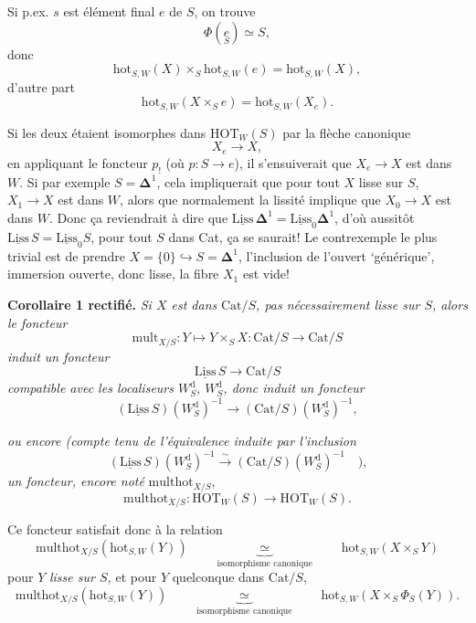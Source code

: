 \documentclass[11pt]{article}
\newcommand{\printedpage}[1]{\marginpar{\footnotesize p.~#1}}
\newcommand{\msp}[1]{\marginpar{\footnotesize [#1]}}
\newcommand{\hot}{\mathrm{hot}}
\newcommand{\HOT}{\mathrm{HOT}}
\newcommand{\Cat}{\mathrm{Cat}}
\newcommand{\Liss}{\underline{\mathrm{Liss}}}
\newcommand{\multhot}{\mathrm{multhot}}
\newcommand{\mult}{\mathrm{mult}}
\begin{document}
\printedpage{94}
Si p.ex. $s$ est élément final $e$ de $S$, on trouve
\[\Phi(\underset{S}{e}) \simeq S,\]
donc
\[\hot_{S,W}(X)\times_S \hot_{S,W}(e)=\hot_{S,W}(X),\]
d'autre part
\[\hot_{S,W}(X\times_S e)=\hot_{S,W}(X_e).\]

\msp{154}
Si les deux étaient isomorphes dans $\HOT_W(S)$ par la flèche canonique
\[X_e\longrightarrow X,\]
en appliquant le foncteur $p_!$ (où $p : S\longrightarrow e$), il s'ensuiverait que $X_e\longrightarrow X$ est dans $W$. Si par exemple $S=\mathbf{\Delta}^1$, cela impliquerait que pour tout $X$ lisse sur $S$, $X_1\longrightarrow X$ est dans $W$, alors que normalement la lissité implique que $X_0\longrightarrow X$ est dans $W$. Donc ça reviendrait à dire que $\Liss\,\mathbf{\Delta}^1=\Liss_0\mathbf{\Delta}^1$, d'où aussitôt $\Liss\,S=\Liss_0S$, pour tout $S$ dans Cat, ça se saurait! Le contrexemple le plus trivial est de prendre $X=\{0\}\hookrightarrow S=\mathbf{\Delta}^1$, l'inclusion de l'ouvert ‘générique’, immersion ouverte, donc lisse, la fibre $X_1$ est vide! %

\textbf{Corollaire 1 rectifié.} \textit{Si $X$ est dans} $\Cat/S$\textit{, pas nécessairement lisse sur $S$, alors le foncteur}
\[\mult_{X/S} : Y\longmapsto Y\times_S X : \Cat/S\longrightarrow \Cat/S\]
\textit{induit un foncteur}
\[\Liss\,S\longrightarrow \Cat/S\]
\textit{compatible avec les localiseurs $W_S^{\mathrm{d}}$, $W_S^{\mathrm{d}}$, donc induit un foncteur}
\[(\Liss\,S)(W_S^{\mathrm{d}})^{-1}\longrightarrow(\Cat/S)(W_S^{\mathrm{d}})^{-1},\]

\msp{155}
\textit{ou encore (compte tenu de l'équivalence induite par l'inclusion}
\[(\underline{\mathrm{Liss}}\,S)(W_S^{\mathrm{d}})^{-1}\xrightarrow{\ \sim\ }(\Cat/S)(W_S^{\mathrm{d}})^{-1}\quad\textit{),}\] %
\textit{un foncteur, encore noté} $\multhot_{X/S}$,
\[\multhot_{X/S} : \HOT_W(S)\longrightarrow\HOT_W(S).\]

Ce foncteur satisfait donc à la relation
\[\multhot_{X/S}(\hot_{S,W}(Y))\qquad\underbrace{\ \simeq\ }_{\text{isomorphisme canonique}}\qquad\hot_{S,W}(X\times_S Y)\]
\printedpage{95}
pour $Y$ \textit{lisse sur $S$,} et pour $Y$ quelconque dans $\Cat/S$,
\[\multhot_{X/S}(\hot_{S,W}(Y))\qquad\underbrace{\ \simeq\ }_{\text{isomorphisme canonique}}\qquad\hot_{S,W}(X\times_S \Phi_S(Y)).\]
\end{document}
